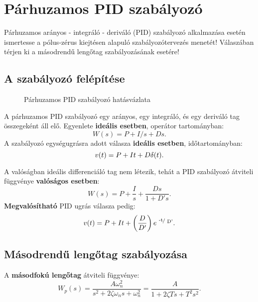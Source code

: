 \section{Párhuzamos PID szabályozó}

\begin{about}
  Párhuzamos arányos - integráló - deriváló (PID) szabályozó alkalmazása esetén
  ismertesse a pólus-zérus kiejtésen alapuló szabályozótervezés menetét!
  Válaszában térjen ki a másodrendű lengőtag szabályozásának esetére!
\end{about}

\subsection{A szabályozó felépítése}

\begin{figure}[htb]
  \centering
  
  \caption{Párhuzamos PID szabályozó hatásvázlata}
  \label{fig:PID}
\end{figure}

A párhuzamos PID szabályozó egy arányos, egy integráló, és egy deriváló tag
összegeként áll elő. Egyenlete \textbf{ideális esetben}, operátor tartományban:
\begin{equation}
  W(s)
  = P + I / s + Ds.
  \label{eq:PID-s}
\end{equation}
A szabályozó egységugrásra adott válasza \textbf{ideális esetben},
időtartományban:
\begin{equation}
  v(t) = P + I t + D \delta(t).
  \label{eq:PID-step}
\end{equation}

A valóságban ideális differenciáló tag nem létezik, tehát a PID szabályozó
átviteli függvénye \textbf{valóságos esetben}:
\begin{equation}
  W(s) = P + \frac{I}{s} + \frac{Ds}{1 + D's}.
  \label{eq:PID-real-s}
\end{equation}
\textbf{Megvalósítható} PID ugrás válasza pedig:
\begin{equation}
  v(t) = P + It + \left(\frac{D}{D'}\right) e^{\slashfrac{-t}{D'}}.
  \label{eq:PID-real-step}
\end{equation}

\subsection{Másodrendű lengőtag szabályozása}

A \textbf{másodfokú lengőtag} átviteli függvénye:
\begin{equation}
  W_p(s)
  = \frac{A \omega_n^2}{s^2 + 2 \zeta \omega_n s + \omega_n^2}
  = \frac{A}{1 + 2 \zeta T s + T^2 s^2}
  .
  \label{eq:W-ref}
\end{equation}

